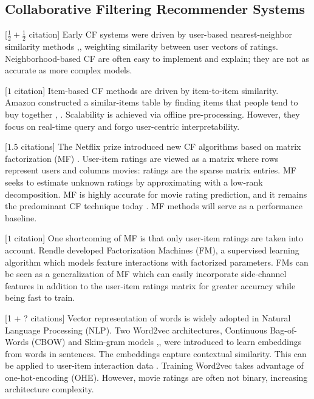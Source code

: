 \subsection{Collaborative Filtering Recommender Systems}

[$ \frac{1}{2} + \frac{1}{2} $ citation] Early CF systems were driven by user-based nearest-neighbor similarity methods \cite{herlocker1999algorithmic},\cite{smith2017two}, weighting similarity between user vectors of ratings. Neighborhood-based CF are often easy to implement and explain; they are not as accurate as more complex models.

[$1$ citation] Item-based CF methods are driven by item-to-item similarity. Amazon constructed a similar-items table by finding items that people tend to buy together \cite{linden2003amazon}, \cite{smith2017two}. Scalability is achieved via offline pre-processing. However, they focus on real-time query and forgo user-centric interpretability. 

[$1.5$ citations] The Netflix prize introduced new CF algorithms based on matrix factorization (MF) \cite{funk2006netflix}. User-item ratings are viewed as a matrix where rows represent users and columns movies: ratings are the sparse matrix entries. MF seeks to estimate unknown ratings by approximating with a low-rank decomposition. MF is highly accurate for movie rating prediction, and it remains the predominant CF technique today \cite{koren2008factorization}. MF methods will serve as a performance baseline.

[$1$ citation] One shortcoming of MF is that only user-item ratings are taken into account. Rendle \cite{rendle2012factorization} developed Factorization Machines (FM), a supervised learning algorithm which models feature interactions with factorized parameters.  FMs can be seen as a generalization of MF which can easily incorporate side-channel features in addition to the user-item ratings matrix for greater accuracy while being fast to train.

[1 + ? citations] Vector representation of words is widely adopted in Natural Language Processing (NLP). Two Word2vec architectures, Continuous Bag-of-Words (CBOW) and Skim-gram models \cite{mikolov2013efficient},\cite{mikolov2013distributed}, \cite{rong2014word2vec} were introduced to learn embeddings from words in sentences. The embeddings capture contextual similarity. This can be applied to user-item interaction data \cite{ozsoy2016word}. Training Word2vec takes advantage of one-hot-encoding (OHE). However, movie ratings are often not binary, increasing architecture complexity.

